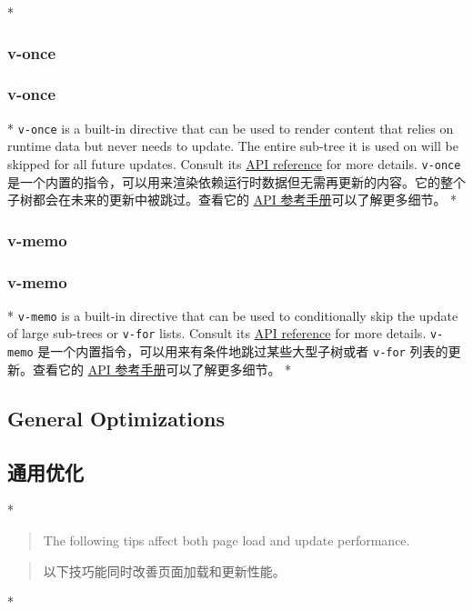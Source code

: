 \begin{paracol}{2} 
 
\switchcolumn[0]*%
\subsubsection{v-once}
\switchcolumn
\subsubsection{v-once}
\switchcolumn[0]*%
\texttt{v-once} is a built-in directive that can be used to render
content that relies on runtime data but never needs to update. The
entire sub-tree it is used on will be skipped for all future updates.
Consult its
\href{https://vuejs.org/api/built-in-directives.html\#v-once}{API
reference} for more details.
\switchcolumn
\texttt{v-once}
是一个内置的指令，可以用来渲染依赖运行时数据但无需再更新的内容。它的整个子树都会在未来的更新中被跳过。查看它的
\href{https://cn.vuejs.org/api/built-in-directives.html\#v-once}{API
参考手册}可以了解更多细节。
\switchcolumn[0]*%
\subsubsection{v-memo}
\switchcolumn
\subsubsection{v-memo}
\switchcolumn[0]*%
\texttt{v-memo} is a built-in directive that can be used to
conditionally skip the update of large sub-trees or \texttt{v-for}
lists. Consult its
\href{https://vuejs.org/api/built-in-directives.html\#v-memo}{API
reference} for more details.
\switchcolumn
\texttt{v-memo} 是一个内置指令，可以用来有条件地跳过某些大型子树或者
\texttt{v-for} 列表的更新。查看它的
\href{https://cn.vuejs.org/api/built-in-directives.html\#v-memo}{API
参考手册}可以了解更多细节。
\switchcolumn[0]*%
\subsection{General Optimizations}
\switchcolumn
\subsection{通用优化}
\switchcolumn[0]*%
\begin{quote}
The following tips affect both page load and update performance.
\end{quote}
\switchcolumn
\begin{quote}
以下技巧能同时改善页面加载和更新性能。
\end{quote}
\switchcolumn[0]*%

\end{paracol}
